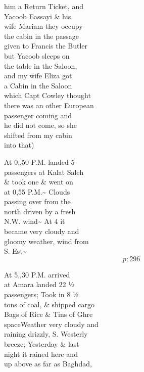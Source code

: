\documentclass{report}
\begin{document}



	\marginpar{}

	\par{
 	him a Return Ticket, and\ \\Yacoob Eassayi \& his\ \\wife Mariam they occupy\ \\the cabin in the passage\ \\given to Francis the Butler\ \\but Yacoob sleeps on\ \\the table in the Saloon,\ \\and my wife Eliza got\ \\a Cabin in the Saloon\ \\which Capt Cowley thought\ \\there was an other European\ \\passenger coming and\ \\he did not come, so she\ \\shifted from my cabin\ \\into that)\ \\
	}

	\par{
 	At 0,,50 P.M. landed 5\ \\passengers at Kalat Saleh\ \\\& took one \& went on\ \\at 0,55 P.M.\~{} Clouds\ \\passing over from the\ \\north driven by a fresh\ \\N.W. wind\~{} At 4 it\ \\became very cloudy and\ \\gloomy weather, wind from\ \\S. Est\~{}\ \\
  \[p: 296 \]

	}


	\par{
 	At 5,,30 P.M. arrived\ \\at Amara landed 22 ½\ \\passengers; Took in 8 ½\ \\tons of coal, \& shipped cargo\ \\Bags of Rice \& Tins of Ghre\ \\\lbrack space\rbrack Weather very cloudy and\ \\raining drizzly, S. Westerly\ \\breeze; Yesterday \& last\ \\night it rained here and\ \\up above as far as Baghdad,\ \\
	}
\end{document}
